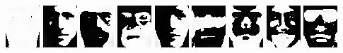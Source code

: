 \documentclass[ 12pt ]{article}
\begin{document}
\begin{enumerate}
\begin{enumerate}
                \begin{center}
                    \includegraphics[scale=1.7]{AnyConv.com__largest1}
                    \includegraphics[scale=1.7]{AnyConv.com__largest2}
                    \includegraphics[scale=1.7]{AnyConv.com__largest3}
                    \includegraphics[scale=1.7]{AnyConv.com__largest4}
                    \includegraphics[scale=1.7]{AnyConv.com__largest5}
                    \includegraphics[scale=1.7]{AnyConv.com__largest6}
                    \includegraphics[scale=1.7]{AnyConv.com__largest7}
                    \includegraphics[scale=1.7]{AnyConv.com__largest8}
                    \includegraphics[scale=1.7]{AnyConv.com__largest9}

\end{center}
\end{enumerate}
\end{enumerate}
\end{document}
